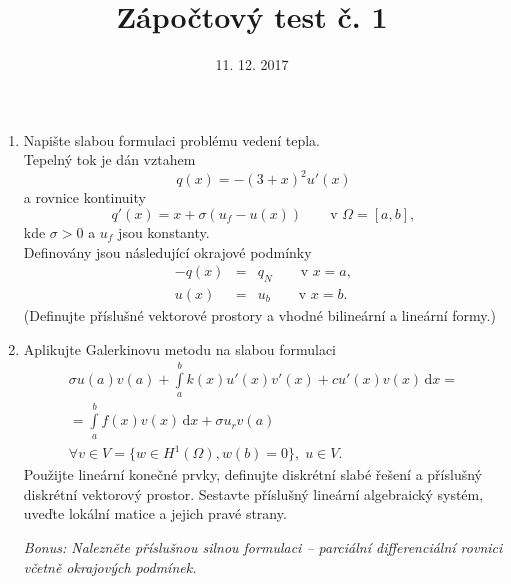 \documentclass{article}
\begin{document}
\title{Zápočtový test č. 1}
\date{11. 12. 2017}
\author{}
\maketitle

\begin{enumerate}
\item Napište slabou formulaci problému vedení tepla.\\
Tepelný tok je dán vztahem
\[
q(x) = -(3+x)^2 u'(x)
\]
a rovnice kontinuity
\[
q'(x) = x + \sigma(u_f - u(x)) \qquad \textrm{v }\Omega=[a,b],
\]
kde $\sigma>0$ a $u_f$ jsou konstanty.\\
Definovány jsou následující okrajové podmínky
\begin{eqnarray*}
-q(x) &=& q_N \qquad \textrm{v } x=a, \\
u(x) &=& u_b \qquad \textrm{v } x=b.
\end{eqnarray*}
(Definujte příslušné vektorové prostory a vhodné bilineární a lineární formy.)


\item Aplikujte Galerkinovu metodu na slabou formulaci
\begin{multline*}
    \sigma u(a)v(a) + \int\limits_a^b k(x) u'(x)v'(x) + cu'(x)v(x) \,\textrm{d}x =\\
    = \int\limits_a^b f(x)v(x) \,\textrm{d}x + \sigma u_r v(a) \\ \forall v\in V=\{w\in H^1(\Omega), w(b) = 0\},\; u\in V.
\end{multline*}
Použijte lineární konečné prvky, definujte diskrétní slabé řešení a příslušný diskrétní vektorový prostor.
Sestavte příslušný lineární algebraický systém, uveďte lokální matice a jejich pravé strany.

\emph{Bonus: Nalezněte příslušnou silnou formulaci -- parciální differenciální rovnici včetně okrajových podmínek.}

\end{enumerate}
\end{document}
